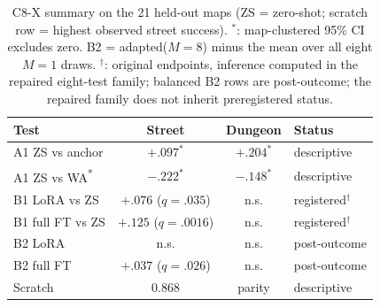 \documentclass[letterpaper]{article} %
\newcommand{\stage}[1]{\textsc{#1}}
\begin{document}
\begin{table}[!b]
\centering
\footnotesize
\setlength{\tabcolsep}{1.4pt}
\begin{tabular}{@{}lccl@{}}
\toprule
Test & Street & Dungeon & Status \\
\midrule
A1 ZS vs anchor & $+.097^{*}$ & $+.204^{*}$ & descriptive \\
A1 ZS vs WA\textsuperscript{*} & $-.222^{*}$ & $-.148^{*}$ & descriptive \\
B1 LoRA vs ZS & $+.076$ ($q{=}.035$) & n.s. & registered$^{\dagger}$ \\
B1 full FT vs ZS & $+.125$ ($q{=}.0016$) & n.s. & registered$^{\dagger}$ \\
B2 LoRA & n.s. & n.s. & post-outcome \\
B2 full FT & $+.037$ ($q{=}.026$) & n.s. & post-outcome \\
Scratch & 0.868 & parity & descriptive \\
\bottomrule
\end{tabular}
\caption{\stage{C8-X} summary on the 21 held-out maps (ZS = zero-shot; scratch row = highest observed street success). $^{*}$: map-clustered 95\% CI excludes zero. B2 = adapted($M{=}8$) minus the mean over all eight $M{=}1$ draws. $^{\dagger}$: original endpoints, inference computed in the repaired eight-test family; balanced B2 rows are post-outcome; the repaired family does not inherit preregistered status.}
\label{tab:c8x-summary}
\end{table}
\end{document}
